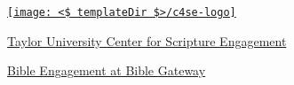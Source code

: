 \begin{center}
  \vspace{0.25in}
  \href{http://tucse.taylor.edu/}{\texttt{[image: <\$ templateDir \$>/c4se-logo]}}

  \vspace{0.25in}
  \href{http://tucse.taylor.edu/}{Taylor University Center for Scripture Engagement}

  \vspace{0.25in}
  \href{https://www.biblegateway.com/resources/scripture-engagement/}{Bible Engagement at Bible Gateway }
\end{center}
